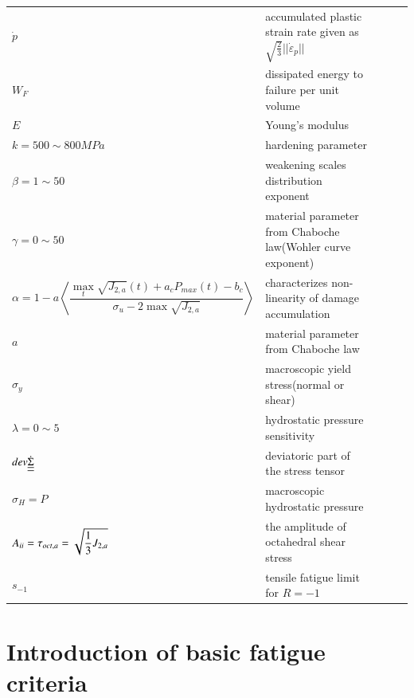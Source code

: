 \documentclass[3p,times,procedia,number]{elsarticle}
\begin{document}
\begin{flushleft}
\begin{table}[h]
\begin{tabular}{lllll}
						$\dot{p}$ & accumulated plastic strain rate given as $\sqrt{\frac{2}{3}}||\dot{\varepsilon}_p||$ &  &  &  \\
						$W_F$ & dissipated energy to failure per unit volume &  &  &  \\
						$E$ & Young's modulus &  &  &  \\
						$k=500\sim800MPa$ & hardening parameter &  &  &  \\
						$\beta=1\sim50$ & weakening scales distribution exponent  &  &  &  \\
						$\gamma=0\sim50$ & material parameter from Chaboche law(Wohler curve exponent)  &  &  &  \\
						$\alpha=1 - a\left\langle \dfrac{\max\limits_{t}\sqrt{J_{2,a}}(t)+a_c{P_{max}(t)}-b_c}{ \sigma_{u} - 2\max\sqrt{J_{2,a}}}\right\rangle$ & characterizes non-linearity of damage accumulation &  &  &  \\
						$a$ & material parameter from Chaboche law &  &  &  \\
						$\sigma_{y}$ & macroscopic yield stress(normal or shear) &  &  &  \\
						$\lambda=0\sim5$& hydrostatic pressure sensitivity &  &  &  \\
						$dev\dot{\uline{\uline{\Sigma}}}$ & deviatoric part of the stress tensor &  &  &  \\
						$\sigma_H=P$& macroscopic hydrostatic pressure &  &  &  \\
						$A_{\uppercase\expandafter{\romannumeral2}}=\tau_{oct,a}=\sqrt{\dfrac{1}{3}J_{2,a}}$& the amplitude of octahedral shear stress &  &  &  \\
						$s_{-1}$& tensile fatigue limit for $R=-1$  &  &  &  \\
		\end{tabular}
	\end{table}
\end{flushleft}

\clearpage

\section{Introduction of basic fatigue criteria}
\end{document}
